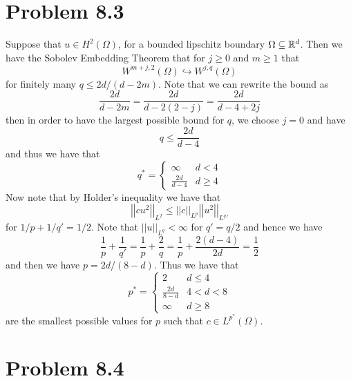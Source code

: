 \documentclass[12pt]{report}
\newcommand{\norm}[1]{\left|\left|#1\right|\right|}
\begin{document}
\section*{Problem 8.3}
Suppose that $u \in H^2(\Omega)$, for a bounded lipschitz boundary $\Omega \subseteq \mathbb{R}^d$. Then we have the Sobolev Embedding Theorem that for $j \geq 0$ and $m \geq 1$ that
\begin{equation*}
  W^{m + j, 2}(\Omega) \hookrightarrow W^{j,q}(\Omega)
\end{equation*}
for finitely many $q \leq 2d/(d-2m)$. Note that we can rewrite the bound as
\begin{equation*}
\frac{2d}{d-2m} = \frac{2d}{d - 2(2-j)} = \frac{2d}{d - 4 + 2j} 
\end{equation*}
then in order to have the largest possible bound for $q$, we choose $j = 0$ and have
\begin{equation*}
  q \leq \frac{2d}{d - 4}
\end{equation*}
and thus we have that
\begin{equation*}
  q^* = \begin{cases}
    \infty & d < 4 \\
    \frac{2d}{d - 4} & d \geq 4
  \end{cases}
\end{equation*}
Now note that by Holder's inequality we have that
\begin{equation*}
  \norm{cu^2}_{L^2} \leq \norm{c}_{L^p} \norm{u^2}_{L^q'}
\end{equation*}
for $1/p + 1/q' = 1/2$. Note that $\norm{u}_{L^q} < \infty$ for $q' = q/2$ and hence we have
\begin{equation*}
  \frac{1}{p} + \frac{1}{q'} = \frac{1}{p} + \frac{2}{q} =  \frac{1}{p} + \frac{2(d-4)}{2d} = \frac{1}{2}
\end{equation*}
and then we have $p = 2d/(8-d)$. Thus we have that
\begin{equation*}
  p^* = \begin{cases}
    2 & d \leq 4 \\
    \frac{2d}{8-d} & 4 < d < 8 \\
    \infty & d \geq 8
  \end{cases}
\end{equation*}
are the smallest possible values for $p$ such that $c \in L^{p^*}(\Omega)$.

\section*{Problem 8.4}
\end{document}
